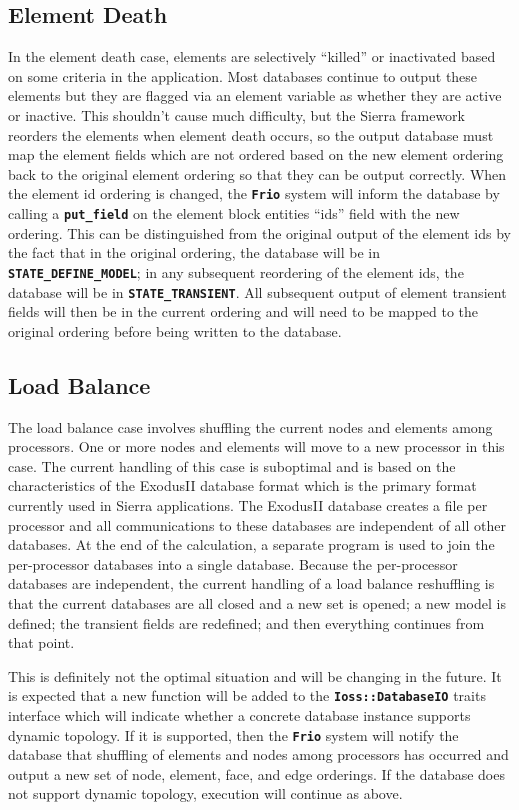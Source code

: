 \documentclass[11pt,twoside]{article}
\newcommand{\code}[1]
   {\mbox{\bf\tt #1}\null}
\begin{document}
\subsection{Element Death}
In the element death case, elements are selectively ``killed'' or
inactivated based on some criteria in the application. Most databases
continue to output these elements but they are flagged via an element
variable as whether they are active or inactive. This shouldn't cause
much difficulty, but the Sierra framework reorders the elements when
element death occurs, so the output database must map the element
fields which are not ordered based on the new element ordering back to
the original element ordering so that they can be output correctly.
When the element id ordering is changed, the \code{Frio}
system will inform the database by calling a
\code{put\_field} on the element block entities ``ids'' field
with the new ordering. This can be distinguished from the original
output of the element ids by the fact that in the original ordering,
the database will be in \code{STATE\_DEFINE\_MODEL}; in any
subsequent reordering of the element ids, the database will be in
\code{STATE\_TRANSIENT}. All subsequent output of element
transient fields will then be in the current ordering and will need to
be mapped to the original ordering before being written to the
database.

\subsection{Load Balance}
The load balance case involves shuffling the current nodes and elements
among processors. One or more nodes and elements will move to a new
processor in this case. The current handling of this case is suboptimal
and is based on the characteristics of the ExodusII database format
which is the primary format currently used in Sierra applications. The
ExodusII database creates a file per processor and all communications
to these databases are independent of all other databases. At the end
of the calculation, a separate program is used to join the
per{}-processor databases into a single database. Because the
per{}-processor databases are independent, the current handling of a
load balance reshuffling is that the current databases are all closed
and a new set is opened; a new model is defined; the transient fields
are redefined; and then everything continues from that point.

This is definitely not the optimal situation and will be changing in the
future. It is expected that a new function will be added to the
\code{Ioss::DatabaseIO} traits interface which will indicate
whether a concrete database instance supports dynamic topology. If it
is supported, then the \code{Frio} system will notify the
database that shuffling of elements and nodes among processors has
occurred and output a new set of node, element, face, and edge
orderings. If the database does not support dynamic topology, execution
will continue as above.
\end{document}
